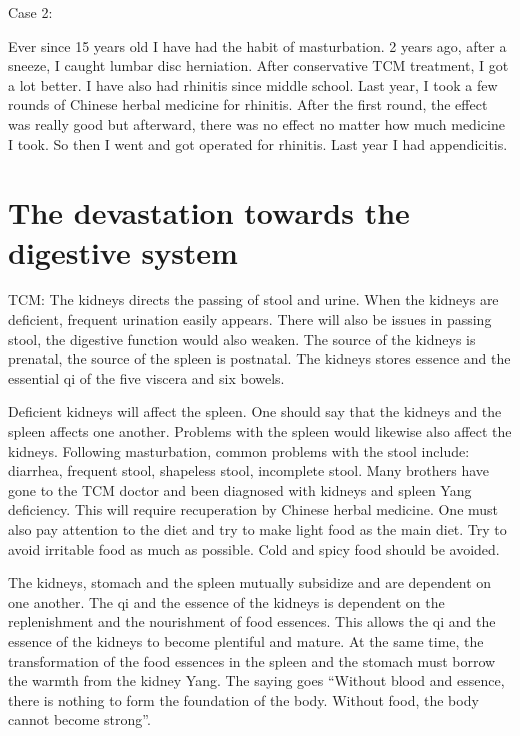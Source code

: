\documentclass[
]{book}
\begin{document}
Case 2:

Ever since 15 years old I have had the habit of masturbation. 2 years ago, after a sneeze, I caught lumbar disc herniation. After conservative TCM treatment, I got a lot better. I have also had rhinitis since middle school. Last year, I took a few rounds of Chinese herbal medicine for rhinitis. After the first round, the effect was really good but afterward, there was no effect no matter how much medicine I took. So then I went and got operated for rhinitis. Last year I had appendicitis.

\hypertarget{the-devastation-towards-the-digestive-system}{%
\section{The devastation towards the digestive system}\label{the-devastation-towards-the-digestive-system}}

TCM: The kidneys directs the passing of stool and urine. When the kidneys are deficient, frequent urination easily appears. There will also be issues in passing stool, the digestive function would also weaken. The source of the kidneys is prenatal, the source of the spleen is postnatal. The kidneys stores essence and the essential qi of the five viscera and six bowels.

Deficient kidneys will affect the spleen. One should say that the kidneys and the spleen affects one another. Problems with the spleen would likewise also affect the kidneys. Following masturbation, common problems with the stool include: diarrhea, frequent stool, shapeless stool, incomplete stool. Many brothers have gone to the TCM doctor and been diagnosed with kidneys and spleen Yang deficiency. This will require recuperation by Chinese herbal medicine. One must also pay attention to the diet and try to make light food as the main diet. Try to avoid irritable food as much as possible. Cold and spicy food should be avoided.

The kidneys, stomach and the spleen mutually subsidize and are dependent on one another. The qi and the essence of the kidneys is dependent on the replenishment and the nourishment of food essences. This allows the qi and the essence of the kidneys to become plentiful and mature. At the same time, the transformation of the food essences in the spleen and the stomach must borrow the warmth from the kidney Yang. The saying goes ``Without blood and essence, there is nothing to form the foundation of the body. Without food, the body cannot become strong''.
\end{document}
